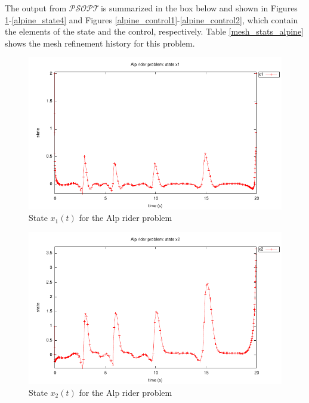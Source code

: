 \documentclass[a4paper,11pt]{report}    %
\newcommand{\psopt}{$\mathcal{PSOPT}$\,}  %
\newenvironment{shadedframe}{%
  \def\FrameCommand{\fcolorbox{black}{shadecolor}}%
  \MakeFramed {\FrameRestore}}
{\endMakeFramed}
\begin{document}
\tiny
\begin{shadedframe}

\end{shadedframe}
\normalsize


The output from \psopt is summarized in the box below and shown in Figures \ref{alpine_state1}-\ref{alpine_state4} and Figures \ref{alpine_control1}-\ref{alpine_control2}, which contain the elements of the state and the control, respectively.
Table \ref{mesh_stats_alpine} shows the mesh refinement history for this problem.

\begin{shadedframe}

\end{shadedframe}




\begin{figure}
  \centering
  \includegraphics{../examples/alpine/alpine_state1}
  \caption{State $x_1(t)$ for the Alp rider problem}
  \label{alpine_state1}
\end{figure}

\begin{figure}
  \centering
  \includegraphics{../examples/alpine/alpine_state2}
  \caption{State $x_2(t)$ for the Alp rider problem}
  \label{alpine_state2}
\end{figure}
\end{document}
